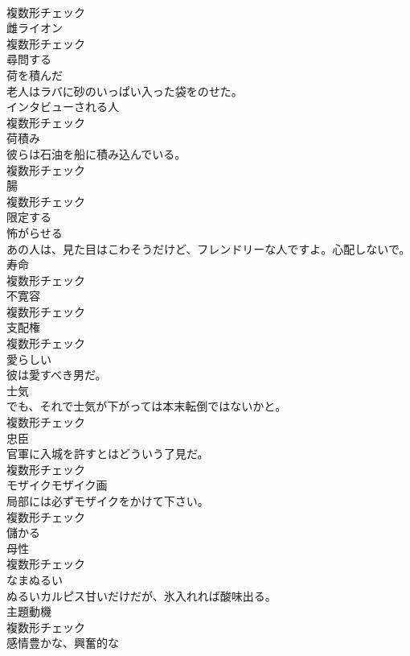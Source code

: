 \documentclass[8pt]{extreport}
\begin{document}
\begin{CJK}{UTF8}{min}
\\	複数形チェック
\\	[名詞]	雌ライオン	
\\	複数形チェック
\\	[動詞]	尋問する	
\\	[形容詞]	荷を積んだ	
\\	老人はラバに砂のいっぱい入った袋をのせた。	
\\	[名詞]	インタビューされる人	
\\	複数形チェック
\\	[名詞]	荷積み	
\\	彼らは石油を船に積み込んでいる。	
\\	複数形チェック
\\	[名詞]	腸	
\\	複数形チェック
\\	[動詞]	限定する	
\\	[動詞]	怖がらせる	
\\	あの人は、見た目はこわそうだけど、フレンドリーな人ですよ。心配しないで。	
\\	[名詞]	寿命	
\\	複数形チェック
\\	[名詞]	不寛容	
\\	複数形チェック
\\	[名詞]	支配権	
\\	複数形チェック
\\	[形容詞]	愛らしい	
\\	彼は愛すべき男だ。	
\\	[名詞]	士気	
\\	でも、それで士気が下がっては本末転倒ではないかと。	
\\	複数形チェック
\\	[名詞]	忠臣	
\\	官軍に入城を許すとはどういう了見だ。	
\\	複数形チェック
\\	[名詞]	モザイクモザイク画	
\\	局部には必ずモザイクをかけて下さい。	
\\	複数形チェック
\\	[形容詞]	儲かる	
\\	[名詞]	母性	
\\	複数形チェック
\\	[形容詞]	なまぬるい	
\\	ぬるいカルピス甘いだけだが、氷入れれば酸味出る。	
\\	[名詞]	主題動機	
\\	複数形チェック
\\	[形容詞]	感情豊かな、興奮的な	

\end{CJK}
\end{document}

